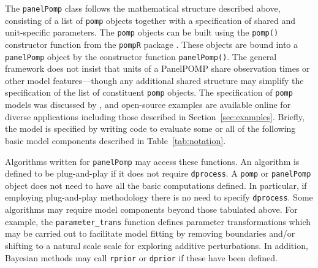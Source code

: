 \documentclass[12pt]{article}\usepackage[]{graphicx}\usepackage[table]{xcolor}
\newcommand\code{\texttt}
\newcommand\R{\texttt{R}\xspace}
\newcommand\panelPomp{\texttt{panelPomp}\xspace}
\newcommand\pomp{\texttt{pomp}\xspace}
\begin{document}
The \code{panelPomp} class follows the mathematical structure described above, consisting of a list of \code{pomp} objects together with a specification of shared and unit-specific parameters.
The \code{pomp} objects can be built using the \code{pomp()} constructor function from the \pomp \R package \citep{king16}.
These objects are bound into a \code{panelPomp} object by the constructor function \code{panelPomp()}.
The general framework does not insist that units of a PanelPOMP share observation times or other model features---though any additional shared structure may simplify the specification of the list of constituent \code{pomp} objects.
The specification of \code{pomp} models was discussed by \citet{king16}, and open-source examples are available online for diverse applications including those described in Section~\ref{sec:examples}.
Briefly, the model is specified by writing code to evaluate some or all of the following basic model components described in Table~\ref{tab:notation}.

Algorithms written for \panelPomp may access these functions.
An algorithm is defined to be plug-and-play if it does not require \code{dprocess}.
A \code{pomp} or \code{panelPomp} object does not need to have all the basic computations defined.
In particular, if employing plug-and-play methodology there is no need to specify \code{dprocess}.
Some algorithms may require model components beyond those tabulated above.
For example, the \code{parameter\_trans} function defines parameter transformations which may be carried out to facilitate model fitting by removing boundaries and/or shifting to a natural scale scale for exploring additive perturbations.
In addition, Bayesian methods may call \code{rprior} or \code{dprior} if these have been defined.
\end{document}
